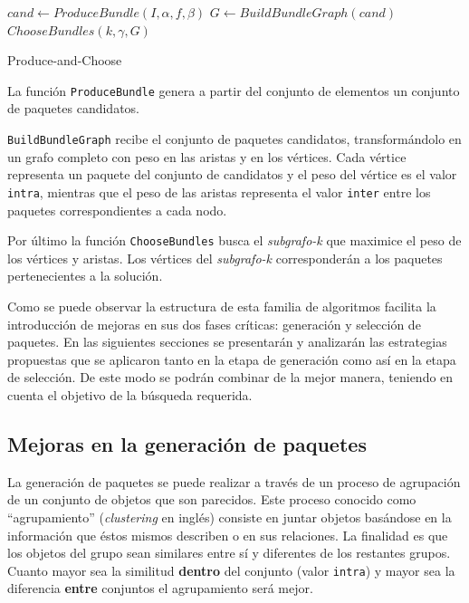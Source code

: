 \begin{center}
	\begin{algorithm}[H]
	\DontPrintSemicolon
	\SetAlgoLined
		$cand \leftarrow ProduceBundle(I,\alpha,f,\beta)$\;
		$G \leftarrow BuildBundleGraph(cand)$\;
		\Return $ChooseBundles(k,\gamma,G)$\;
	\caption{Produce-and-Choose}\label{alg:PAC}
	\end{algorithm}
\end{center}

La función \texttt{ProduceBundle} genera a partir del conjunto de elementos un conjunto de paquetes candidatos.

\texttt{BuildBundleGraph} recibe el conjunto de paquetes candidatos, transformándolo en un grafo completo con peso en las aristas y en los vértices. Cada vértice representa un paquete del conjunto de candidatos y el peso del vértice es el valor \texttt{intra}, mientras que el peso de las aristas representa el valor \texttt{inter} entre los paquetes correspondientes a cada nodo. 

Por último la función \texttt{ChooseBundles} busca el \textit{subgrafo-k} que maximice el peso de los vértices y aristas. Los vértices del \textit{subgrafo-k} corresponderán a los paquetes pertenecientes a la solución.

Como se puede observar la estructura de esta familia de algoritmos facilita la introducción de mejoras en sus dos fases críticas: generación y selección de paquetes. En las siguientes secciones se presentarán y analizarán las estrategias propuestas que se aplicaron tanto en la etapa de generación como así en la etapa de selección. De este modo se podrán combinar de la mejor manera, teniendo en cuenta el objetivo de la búsqueda requerida.

\subsection{Mejoras en la generación de paquetes}
La generación de paquetes se puede realizar a través de un proceso de agrupación de un conjunto de objetos que son parecidos. Este proceso conocido como ``agrupamiento'' (\textit{clustering} en inglés) \cite{wiki:clustering} consiste en juntar objetos basándose en la información que éstos mismos describen o en sus relaciones. La finalidad es que los objetos del grupo sean similares entre sí y diferentes de los restantes grupos. Cuanto mayor sea la similitud \textbf{dentro} del conjunto (valor \texttt{intra}) y mayor sea la diferencia \textbf{entre} conjuntos el agrupamiento será mejor.

